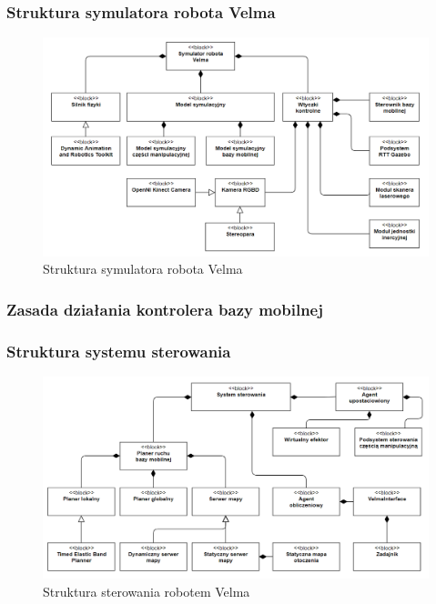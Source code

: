 \begin{frame}
    \frametitle{Struktura symulatora robota Velma} 
    \begin{figure}[b]
        \label{sim_system}
        \centering
        \def\svgwidth{\columnwidth}
        \vspace{0.1cm}
        \includegraphics[scale=0.35]{images/sim_system.png}
        \vspace{0.1cm}
        \caption{Struktura symulatora robota Velma}
    \end{figure}
\end{frame}

\begin{frame}
    \frametitle{Zasada działania kontrolera bazy mobilnej} 
\end{frame}

\begin{frame}
    \frametitle{Struktura systemu sterowania} 
    \begin{figure}[b]
        \label{control_system}
        \centering
        \def\svgwidth{\columnwidth}
        \vspace{0.1cm}
        \includegraphics[scale=0.35]{images/control_system.png}
        \vspace{0.1cm}
        \caption{Struktura sterowania robotem Velma}
    \end{figure}
\end{frame}




